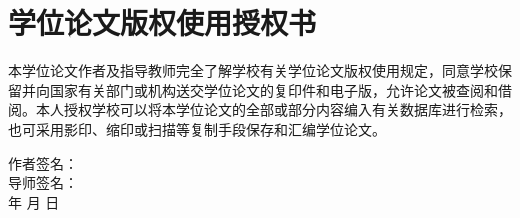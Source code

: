 \chapter{学位论文版权使用授权书}

本学位论文作者及指导教师完全了解学校有关学位论文版权使用规定，同意学校保留并向国家有关部门或机构送交学位论文的复印件和电子版，允许论文被查阅和借阅。本人授权学校可以将本学位论文的全部或部分内容编入有关数据库进行检索，也可采用影印、缩印或扫描等复制手段保存和汇编学位论文。

\vskip 108pt
\begin{flushright}
	作者签名：\makebox[2.5cm]{} \\
	导师签名：\makebox[2.5cm]{} \\
	\quad \quad 年 \quad \quad 月 \quad \quad 日
\end{flushright}
